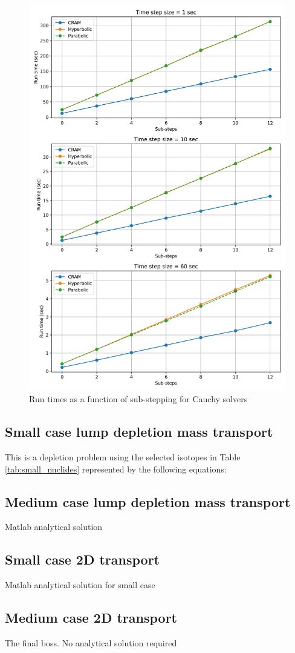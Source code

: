\clearpage

\begin{figure}[p]
    \centering
    \includegraphics[width=5in]{images/chapter-5/caseStudies/neutronPrecursors/neutronPrecursorsCauchyRuntimes.png}
    \caption{Run times as a function of sub-stepping for Cauchy solvers}
    \label{fig:neutron_precursors_substepping_cauchy_runtimes}
\end{figure}

\clearpage

\subsection{Small case lump depletion mass transport}
This is a depletion problem using the selected isotopes in Table \ref{tab:small_nuclides} represented by the following equations:


\subsection{Medium case lump depletion mass transport}
Matlab analytical solution

\subsection{Small case 2D transport}
Matlab analytical solution for small case 

\subsection{Medium case 2D transport}
The final boss. No analytical solution required
